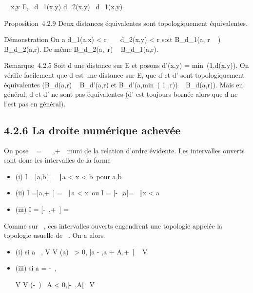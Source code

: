 \documentclass[]{article}
\begin{document}
\forall~~x,y \in E,\quad
\alpha~d_1(x,y) \leq d_2(x,y) \leq \beta~d_1(x,y)

Proposition~4.2.9 Deux distances équivalentes sont topologiquement
équivalentes.

Démonstration On a d_1(a,x) < r
\over \beta~ \rigtharrow~ d_2(x,y) < r soit
B_d_1(a, r \over \beta~ ) \subset~
B_d_2(a,r). De même B_d_2(a,\alpha~r) \subset~
B_d_1(a,r).

Remarque~4.2.5 Soit d une distance sur E et posons d'(x,y)
= min~(1,d(x,y)). On vérifie facilement que d
est une distance sur E, que d et d' sont topologiquement équivalentes
(B_d(a,r) \subset~ B_d'(a,r) et
B_d'(a,min~( 1  ,r)) \subset~ B_d(a,r)). Mais en général, d et d' ne sont pas
équivalentes (d' est toujours bornée alors que d ne l'est pas en
général).

\subsection{4.2.6 La droite numérique achevée}

On pose \overline{}~ = ~
\cup\-\infty~,+\infty~\ muni de la relation d'ordre
évidente. Les intervalles ouverts sont donc les intervalles de la forme

\begin{itemize}
\itemsep1pt\parskip0pt
\item
  (i) I =]a,b[= \x \in {}~∣a
  < x < b\ pour a,b
  \in\overline{}~
\item
  (ii) I =]a,+\infty~] = \x
  \in\overline{}~∣a
  < x\ ou I = [-\infty~,a[= \x
  \in\overline{}~∣x
  < a\
\item
  (iii) I = [-\infty~,+\infty~] = \overline{}~
\end{itemize}

Comme sur ~, ces intervalles ouverts engendrent une topologie appelée la
topologie usuelle de \overline\mathbb{R}~. On a alors

\begin{itemize}
\item
  (i) si a \in {}~, V \in V (a) \Leftrightarrow
  \exists~\epsilon > 0,\quad
  ]a - \epsilon,a + \epsilon[\subset~ V
\item
  (ii) si a = +\infty~,

  V \in V (+\infty~) \Leftrightarrow \exists~A
  > 0,\quad ]A,+\infty~] \subset~ V
\item
  (iii) si a = -\infty~,

  V \in V (-\infty~) \Leftrightarrow \exists~A
  < 0,\quad [-\infty~,A[\subset~ V
\end{itemize}
\end{document}
